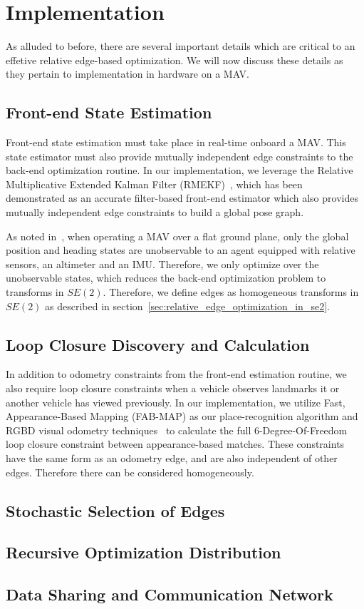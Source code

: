 
\section{Implementation}
As alluded to before, there are several important details which are critical to an effetive relative edge-based optimization.  We will now discuss these details as they pertain to implementation in hardware on a MAV.

\subsection{Front-end State Estimation}
Front-end state estimation must take place in real-time onboard a MAV. This state estimator must also provide mutually independent edge constraints to the back-end optimization routine.  In our implementation, we leverage the Relative Multiplicative Extended Kalman Filter (RMEKF)~\cite{Koch2017}, which has been demonstrated as an accurate filter-based front-end estimator which also provides mutually independent edge constraints to build a global pose graph.

As noted in~\cite{Wheeler2017a}, when operating a MAV over a flat ground plane, only the global position and heading states are unobservable to an agent equipped with relative sensors, an altimeter and an IMU.  Therefore, we only optimize over the unobservable states, which reduces the back-end optimization problem to transforms in $SE(2)$.  Therefore, we define edges as homogeneous transforms in $SE(2)$ as described in section~\ref{sec:relative_edge_optimization_in_se2}.

\subsection{Loop Closure Discovery and Calculation}
In addition to odometry constraints from the front-end estimation routine, we also require loop closure constraints when a vehicle observes landmarks it or another vehicle has viewed previously.  In our implementation, we utilize Fast, Appearance-Based Mapping (FAB-MAP) as our place-recognition algorithm and RGBD visual odometry techniques~\cite{Leishman2013} to calculate the full 6-Degree-Of-Freedom loop closure constraint between appearance-based matches.  These constraints have the same form as an odometry edge, and are also independent of other edges.  Therefore there can be considered homogeneously.

\subsection{Stochastic Selection of Edges}

\subsection{Recursive Optimization Distribution}

\subsection{Data Sharing and Communication Network} 

